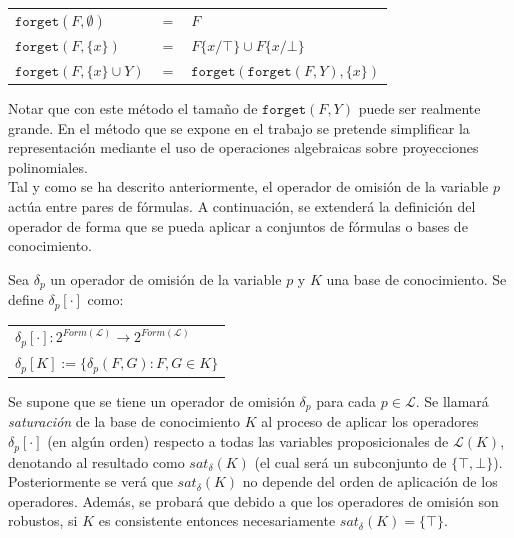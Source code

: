 \begin{tabular}{lll}
$\texttt{forget}(F, \emptyset)$ & $=$ & $F$\\
$\texttt{forget}(F, \{ x \})$ & $= $ & $F\{x/\top \} \cup F\{x/\bot \}$ \\
$\texttt{forget}(F, \{ x \} \cup Y)$ & $= $ & $\texttt{forget} (\texttt{forget}(F,Y),\{ x \})$
\end{tabular}

\vspace{0.5cm}

Notar que con este método el tamaño de $\texttt{forget}(F,Y)$ puede ser realmente grande. En el método que se expone en el trabajo se pretende simplificar la representación mediante el uso de operaciones algebraicas sobre proyecciones polinomiales.\\

Tal y como se ha descrito anteriormente, el operador de omisión de la variable $p$ actúa entre pares de fórmulas. A continuación, se extenderá la definición del operador de forma que se pueda aplicar a conjuntos de fórmulas o bases de conocimiento.

 Sea $\delta_p$ un operador de omisión de la variable $p$ y $K$ una base de conocimiento. Se define $\delta_p [\cdot ]$ como:\\

\begin{tabular}{l}
$\delta_p [\cdot ] : 2^{Form(\mathcal{L})} \rightarrow 2^{Form(\mathcal{L})}$ \\
$\delta_p [K] := \{ \delta_p (F,G) : F,G \in K \}$
\end{tabular}

\vspace{0.5cm}

 Se supone que se tiene un operador de omisión $\delta_p$ para cada $p\in \mathcal{L}$. Se llamará \textit{saturación} de la base de conocimiento $K$ al proceso de aplicar los operadores $\delta_p [\cdot ]$ (en algún orden) respecto a todas las variables proposicionales de $\mathcal{L}(K)$, denotando al resultado como $sat_{\delta}(K)$ (el cual será un subconjunto de $\{ \top , \bot \}$).\\

Posteriormente se verá que $sat_{\delta}(K)$ no depende del orden de aplicación de los operadores. Además, se probará que debido a que los operadores de omisión son robustos, si $K$ es consistente entonces necesariamente $sat_{\delta}(K)=\{ \top \}$.\\

